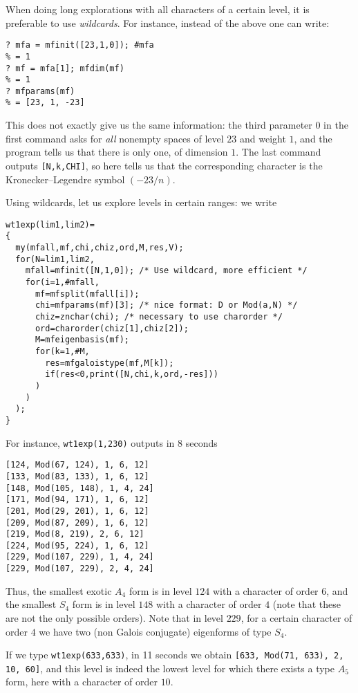 \documentclass[11pt]{article}
\def\kbd#1{{\tt #1}}
\begin{document}
When doing long explorations with all characters of a certain level, it
is preferable to use \emph{wildcards}. For instance, instead of the above
one can write:

\begin{verbatim}
? mfa = mfinit([23,1,0]); #mfa
% = 1
? mf = mfa[1]; mfdim(mf)
% = 1
? mfparams(mf)
% = [23, 1, -23]
\end{verbatim}

This does not exactly give us the same information: the third parameter $0$
in the first command asks for \emph{all} nonempty spaces of level $23$ and
weight $1$, and the program tells us that there is only one, of dimension $1$.
The last command outputs \kbd{[N,k,CHI]}, so here tells us that the
corresponding character is the Kronecker--Legendre symbol $(-23/n)$.

Using wildcards, let us explore levels in certain ranges: we write

\begin{verbatim}
wt1exp(lim1,lim2)=
{
  my(mfall,mf,chi,chiz,ord,M,res,V);
  for(N=lim1,lim2,
    mfall=mfinit([N,1,0]); /* Use wildcard, more efficient */
    for(i=1,#mfall,
      mf=mfsplit(mfall[i]);
      chi=mfparams(mf)[3]; /* nice format: D or Mod(a,N) */
      chiz=znchar(chi); /* necessary to use charorder */
      ord=charorder(chiz[1],chiz[2]);
      M=mfeigenbasis(mf);
      for(k=1,#M,
        res=mfgaloistype(mf,M[k]);
        if(res<0,print([N,chi,k,ord,-res]))
      )
    )
  );
}
\end{verbatim}

For instance, \kbd{wt1exp(1,230)} outputs in 8 seconds

\begin{verbatim}
[124, Mod(67, 124), 1, 6, 12]
[133, Mod(83, 133), 1, 6, 12]
[148, Mod(105, 148), 1, 4, 24]
[171, Mod(94, 171), 1, 6, 12]
[201, Mod(29, 201), 1, 6, 12]
[209, Mod(87, 209), 1, 6, 12]
[219, Mod(8, 219), 2, 6, 12]
[224, Mod(95, 224), 1, 6, 12]
[229, Mod(107, 229), 1, 4, 24]
[229, Mod(107, 229), 2, 4, 24]
\end{verbatim}

Thus, the smallest exotic $A_4$ form is in level $124$ with a character
of order $6$, and the smallest $S_4$ form is in level $148$ with a character
of order $4$ (note that these are not the only possible orders). Note that
in level $229$, for a certain character of order $4$ we have two (non Galois
conjugate) eigenforms of type $S_4$.

If we type \kbd{wt1exp(633,633)}, in 11 seconds we obtain
\kbd{[633, Mod(71, 633), 2, 10, 60]}, and this level is indeed the lowest
level for which there exists a type $A_5$ form, here with a character of order
$10$.
\end{document}
